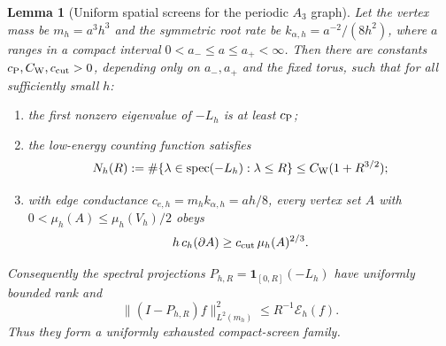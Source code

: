\documentclass[11pt]{article}
\newtheorem{lemma}[lemma]{Lemma}
\theoremstyle{definition}
\theoremstyle{remark}
\newcommand{\one}{\mathbf 1}
\newcommand{\spec}{\operatorname{spec}}
\newcommand{\norm}[1]{\lVert#1\rVert}
\begin{document}
\begin{lemma}[Uniform spatial screens for the periodic $A_3$ graph]
\label{lem:supp-periodic-screens}
Let the vertex mass be $m_h=a^3h^3$ and the symmetric root rate be
$k_{\alpha,h}=a^{-2}/(8h^2)$, where $a$ ranges in a compact interval
$0<a_-\le a\le a_+<\infty$.  Then there are constants
$c_{\rm P},C_{\rm W},c_{\rm cut}>0$, depending only on
$a_-,a_+$ and the fixed torus, such that for all sufficiently small $h$:
\begin{enumerate}[label=\textup{(\roman*)},leftmargin=2.8em]
\item the first nonzero eigenvalue of $-L_h$ is at least $c_{\rm P}$;
\item the low-energy counting function satisfies
      \begin{equation}
       N_h(R):=\#\{\lambda\in\spec(-L_h):\lambda\le R\}
       \le C_{\rm W}(1+R^{3/2});
       \label{eq:supp-weyl-count}
      \end{equation}
\item with edge conductance
      $c_{e,h}=m_hk_{\alpha,h}=ah/8$, every vertex set $A$ with
      $0<\mu_h(A)\le\mu_h(V_h)/2$ obeys
      \begin{equation}
       h\,c_h(\partial A)
       \ge c_{\rm cut}\,\mu_h(A)^{2/3}.
       \label{eq:supp-periodic-cut}
      \end{equation}
\end{enumerate}
Consequently the spectral projections
$P_{h,R}=\one_{[0,R]}(-L_h)$ have uniformly bounded rank and
\begin{equation}
 \norm{(I-P_{h,R})f}_{L^2(m_h)}^2
 \le R^{-1}\mathcal E_h(f).
 \label{eq:supp-screen-tail}
\end{equation}
Thus they form a uniformly exhausted compact-screen family.
\end{lemma}
\end{document}
